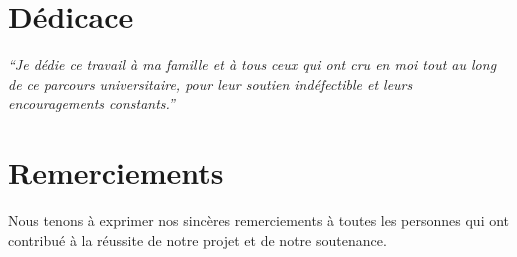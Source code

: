 \documentclass[12pt,a4paper,oneside]{extbook}
\begin{document}


\frontmatter
\pagestyle{fancy}
\fancyhf{}
\cfoot{\thepage}
\renewcommand{\headrulewidth}{0pt}
\renewcommand{\footrulewidth}{0pt}
\fancypagestyle{plain}{%
  \fancyhf{}
  \cfoot{\thepage}
  \renewcommand{\headrulewidth}{0pt}
  \renewcommand{\footrulewidth}{0pt}
}

\chapter*{Dédicace}
\vspace*{3cm}
\begin{center}
     \textit{
``Je dédie ce travail à ma famille et à tous ceux qui ont cru en moi tout au long de ce parcours universitaire, pour leur soutien indéfectible et leurs encouragements constants.''}
\end{center}

\chapter*{Remerciements}
Nous tenons à exprimer nos sincères remerciements à toutes les personnes qui ont contribué à la réussite de notre projet et de notre soutenance.
\end{document}

